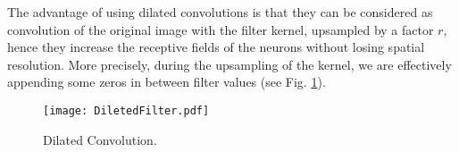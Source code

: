 \documentclass[a4paper]{mva_style}
\DeclarePairedDelimiter\ceil{\lceil}{\rceil}
\DeclarePairedDelimiter\floor{\lfloor}{\rfloor}
\begin{document}
The advantage of using dilated convolutions is that they can be considered as convolution of the original image with the filter kernel, upsampled by a factor $r$, hence they increase the receptive fields of the neurons without losing spatial resolution. More precisely, during the upsampling of the kernel, we are effectively appending some zeros in between filter values (see Fig. \ref{fig:DilatedFilter}). %
\begin{figure}[H]
  \begin{minipage}[b]{1\linewidth}
    \centering
     \centerline{\texttt{[image: DiletedFilter.pdf]}}
\end{minipage}
    \caption{Dilated Convolution.}
  \label{fig:DilatedFilter}
\end{figure}

\end{document}
